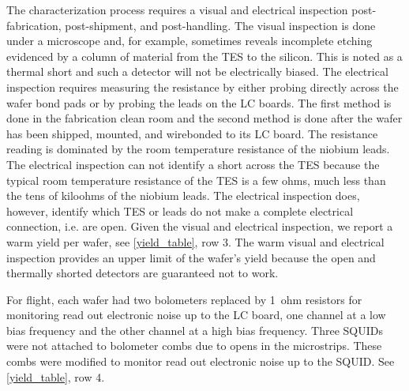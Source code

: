 \documentclass[../EBEXPaper2.tex]{subfiles}
\begin{document}
The characterization process requires a visual and electrical inspection post-fabrication, post-shipment, and post-handling. 
The visual inspection is done under a microscope and, for example, sometimes reveals incomplete etching evidenced by a column of material from the \ac{TES} to the silicon. 
This is noted as a thermal short and such a detector will not be electrically biased. 
The electrical inspection requires measuring the resistance by either probing directly across the wafer bond pads or by probing the leads on the \ac{LC} boards. 
The first method is done in the fabrication clean room and the second method is done after the wafer has been shipped, mounted, and wirebonded to its \ac{LC} board. 
The resistance reading is dominated by the room temperature resistance of the niobium leads. 
The electrical inspection can not identify a short across the \ac{TES} because the typical room temperature resistance of the \ac{TES} is a few ohms, much less than the tens of kiloohms of the niobium leads. 
The electrical inspection does, however, identify which \ac{TES} or leads do not make a complete electrical connection, i.e. are open. 
Given the visual and electrical inspection, we report a warm yield per wafer, see \TAB\ref{yield_table}, row 3. 
The warm visual and electrical inspection provides an upper limit of the wafer's yield because the open and thermally shorted detectors are guaranteed not to work. 

For flight, each wafer had two bolometers replaced by 1~ohm resistors for monitoring read out electronic noise up to the \ac{LC} board, one channel at a low bias frequency and the other channel at a high bias frequency. Three \ac{SQUID}s were not attached to bolometer combs due to opens in the microstrips. These combs were modified to monitor read out electronic noise up to the \ac{SQUID}. See \TAB\ref{yield_table}, row 4. 
\end{document}
